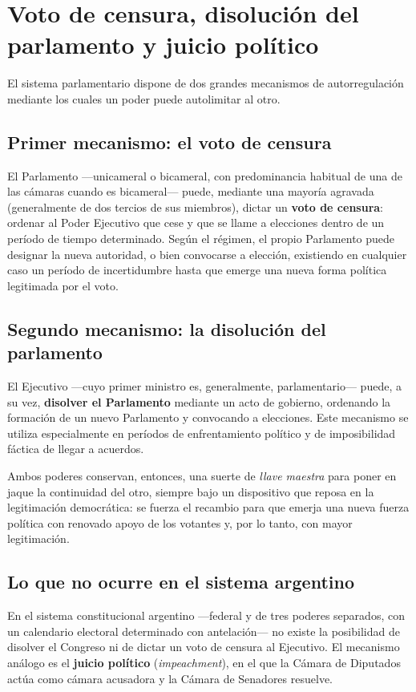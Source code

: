 \documentclass[12pt,oneside]{book}
\begin{document}
\section{Voto de censura, disolución del parlamento y juicio político}

El sistema parlamentario dispone de dos grandes mecanismos de autorregulación mediante los cuales un poder puede autolimitar al otro.

\subsection{Primer mecanismo: el voto de censura}

El Parlamento —unicameral o bicameral, con predominancia habitual de una de las cámaras cuando es bicameral— puede, mediante una mayoría agravada (generalmente de dos tercios de sus miembros), dictar un \textbf{voto de censura}: ordenar al Poder Ejecutivo que cese y que se llame a elecciones dentro de un período de tiempo determinado. Según el régimen, el propio Parlamento puede designar la nueva autoridad, o bien convocarse a elección, existiendo en cualquier caso un período de incertidumbre hasta que emerge una nueva forma política legitimada por el voto.

\subsection{Segundo mecanismo: la disolución del parlamento}

El Ejecutivo —cuyo primer ministro es, generalmente, parlamentario— puede, a su vez, \textbf{disolver el Parlamento} mediante un acto de gobierno, ordenando la formación de un nuevo Parlamento y convocando a elecciones. Este mecanismo se utiliza especialmente en períodos de enfrentamiento político y de imposibilidad fáctica de llegar a acuerdos.

Ambos poderes conservan, entonces, una suerte de \emph{llave maestra} para poner en jaque la continuidad del otro, siempre bajo un dispositivo que reposa en la legitimación democrática: se fuerza el recambio para que emerja una nueva fuerza política con renovado apoyo de los votantes y, por lo tanto, con mayor legitimación.

\subsection{Lo que no ocurre en el sistema argentino}

En el sistema constitucional argentino —federal y de tres poderes separados, con un calendario electoral determinado con antelación— no existe la posibilidad de disolver el Congreso ni de dictar un voto de censura al Ejecutivo. El mecanismo análogo es el \textbf{juicio político} (\emph{impeachment}), en el que la Cámara de Diputados actúa como cámara acusadora y la Cámara de Senadores resuelve.
\end{document}
